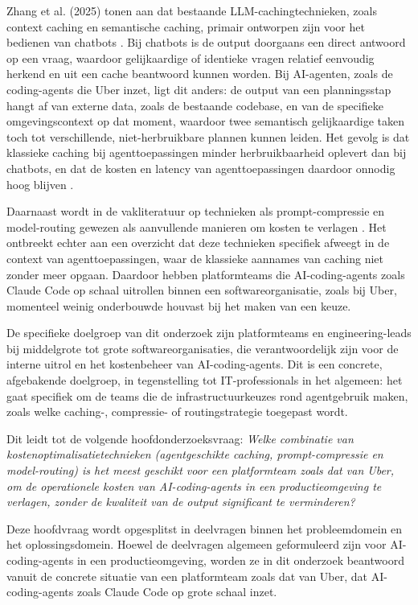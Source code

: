 \documentclass{hogent-article}
\begin{document}
Zhang et al. (2025) tonen aan dat bestaande LLM-cachingtechnieken, zoals context caching en semantische caching, primair ontworpen zijn voor het bedienen van chatbots \autocite{Zhang2025}. Bij chatbots is de output doorgaans een direct antwoord op een vraag, waardoor gelijkaardige of identieke vragen relatief eenvoudig herkend en uit een cache beantwoord kunnen worden. Bij AI-agenten, zoals de coding-agents die Uber inzet, ligt dit anders: de output van een planningsstap hangt af van externe data, zoals de bestaande codebase, en van de specifieke omgevingscontext op dat moment, waardoor twee semantisch gelijkaardige taken toch tot verschillende, niet-herbruikbare plannen kunnen leiden. Het gevolg is dat klassieke caching bij agenttoepassingen minder herbruikbaarheid oplevert dan bij chatbots, en dat de kosten en latency van agenttoepassingen daardoor onnodig hoog blijven \autocite{Zhang2025}.

Daarnaast wordt in de vakliteratuur op technieken als prompt-compressie en model-routing gewezen als aanvullende manieren om kosten te verlagen \autocite{Chen2024}. Het ontbreekt echter aan een overzicht dat deze technieken specifiek afweegt in de context van agenttoepassingen, waar de klassieke aannames van caching niet zonder meer opgaan. Daardoor hebben platformteams die AI-coding-agents zoals Claude Code op schaal uitrollen binnen een softwareorganisatie, zoals bij Uber, momenteel weinig onderbouwde houvast bij het maken van een keuze.

De specifieke doelgroep van dit onderzoek zijn platformteams en engineering-leads bij middelgrote tot grote softwareorganisaties, die verantwoordelijk zijn voor de interne uitrol en het kostenbeheer van AI-coding-agents. Dit is een concrete, afgebakende doelgroep, in tegenstelling tot IT-professionals in het algemeen: het gaat specifiek om de teams die de infrastructuurkeuzes rond agentgebruik maken, zoals welke caching-, compressie- of routingstrategie toegepast wordt.

Dit leidt tot de volgende hoofdonderzoeksvraag: \emph{Welke combinatie van kostenoptimalisatietechnieken (agentgeschikte caching, prompt-compressie en model-routing) is het meest geschikt voor een platformteam zoals dat van Uber, om de operationele kosten van AI-coding-agents in een productieomgeving te verlagen, zonder de kwaliteit van de output significant te verminderen?}

Deze hoofdvraag wordt opgesplitst in deelvragen binnen het probleemdomein en het oplossingsdomein. Hoewel de deelvragen algemeen geformuleerd zijn voor AI-coding-agents in een productieomgeving, worden ze in dit onderzoek beantwoord vanuit de concrete situatie van een platformteam zoals dat van Uber, dat AI-coding-agents zoals Claude Code op grote schaal inzet.
\end{document}

